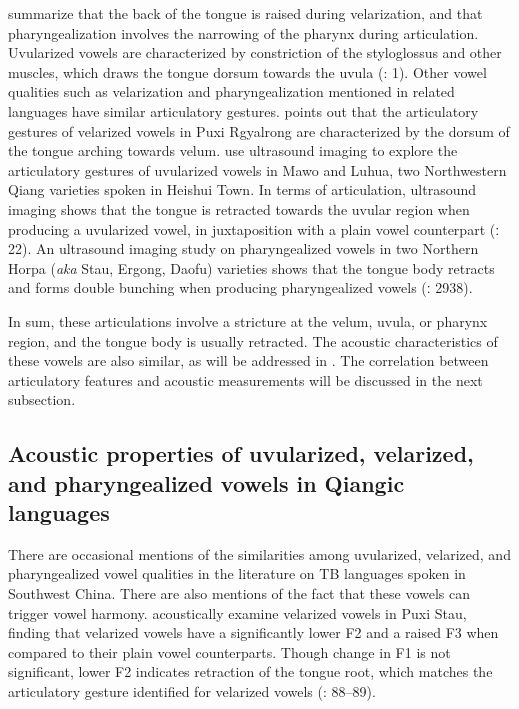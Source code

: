 \documentclass[output=paper]{langscibook}
\begin{document}
\citet[235--236]{LadefogedJohnson2011} summarize that the back of the tongue is raised during velarization, and that pharyngealization involves the narrowing of the pharynx during articulation. Uvularized vowels are characterized by constriction of the styloglossus and other muscles, which draws the tongue dorsum towards the uvula (\citealt{EvansEtAl2016}: 1). Other vowel qualities such as velarization and pharyngealization mentioned in related languages have similar articulatory gestures. \citet[215]{Sun2000b} points out that the articulatory gestures of velarized vowels in Puxi Rgyalrong are characterized by the dorsum of the tongue arching towards velum. \citet{EvansEtAl2016} use ultrasound imaging to explore the articulatory gestures of uvularized vowels in Mawo and Luhua, two Northwestern Qiang varieties spoken in Heishui Town. In terms of articulation, ultrasound imaging shows that the tongue is retracted towards the uvular region when producing a uvularized vowel, in juxtaposition with a plain vowel counterpart (\citealt{EvansEtAl2016}ː 22). An ultrasound imaging study on pharyngealized vowels in two Northern Horpa (\textit{aka} Stau, Ergong, Daofu) varieties shows that the tongue body retracts and forms double bunching when producing pharyngealized vowels (\citealt{ChiuSun2020}ː 2938).

In sum, these articulations involve a stricture at the velum, uvula, or pharynx region, and the tongue body is usually retracted. The acoustic characteristics of these vowels are also similar, as will be addressed in . The correlation between articulatory features and acoustic measurements will be discussed in the next subsection.

\subsection{Acoustic properties of uvularized, velarized, and pharyngealized vowels in Qiangic languages}\label{sec:guan:3.3}

There are occasional mentions of the similarities among uvularized, velarized, and pharyngealized vowel qualities in the literature on TB languages spoken in Southwest China. There are also mentions of the fact that these vowels can trigger vowel harmony. \citet[88]{LinEtAl2012} acoustically examine velarized vowels in Puxi Stau, finding that velarized vowels have a significantly lower F2 and a raised F3 when compared to their plain vowel counterparts. Though change in F1 is not significant, lower F2 indicates retraction of the tongue root, which matches the articulatory gesture identified for velarized vowels (\citealt{LinEtAl2012}: 88--89).
\end{document}
